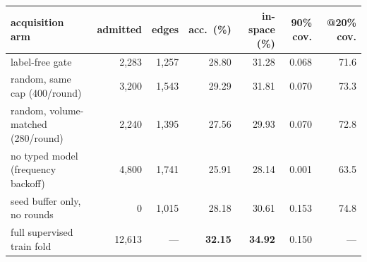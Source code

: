 {\setlength{\tabcolsep}{4.5pt}\begin{tabular}{lrrrrrr}\toprule
acquisition arm & admitted & edges & acc.\ (\%) & in-space (\%) & 90\% cov. & @20\% cov. \\\midrule
label-free gate & 2{,}283 & 1{,}257 & 28.80 & 31.28 & 0.068 & 71.6 \\
random, same cap (400/round) & 3{,}200 & 1{,}543 & 29.29 & 31.81 & 0.070 & 73.3 \\
random, volume-matched (280/round) & 2{,}240 & 1{,}395 & 27.56 & 29.93 & 0.070 & 72.8 \\
no typed model (frequency backoff) & 4{,}800 & 1{,}741 & 25.91 & 28.14 & 0.001 & 63.5 \\
\midrule
seed buffer only, no rounds & 0 & 1{,}015 & 28.18 & 30.61 & 0.153 & 74.8 \\
full supervised train fold & 12{,}613 & --- & \textbf{32.15} & \textbf{34.92} & 0.150 & --- \\
\bottomrule\end{tabular}}

